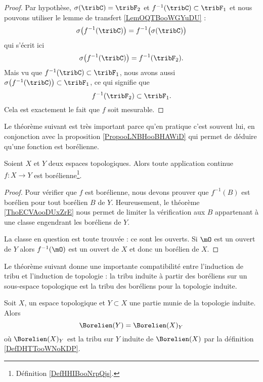 \begin{proof}
    Par hypothèse, \( \sigma(\tribC)=\tribF_2\) et \( f^{-1}(\tribC)\subset \tribF_1\) et nous pouvons utiliser le lemme de transfert \ref{LemOQTBooWGYuDU} :
    \begin{equation}
        \sigma\big( f^{-1}(\tribC) \big)=f^{-1}\big( \sigma(\tribC) \big)
    \end{equation}
    qui s'écrit ici
    \begin{equation}
        \sigma\big( f^{-1}(\tribC) \big)=f^{-1}(\tribF_2).
    \end{equation}
    Mais vu que \( f^{-1}(\tribC)\subset \tribF_1\), nous avons aussi \( \sigma\big( f^{-1}(\tribC) \big)\subset \tribF_1\), ce qui signifie que
    \begin{equation}
        f^{-1}(\tribF_2)\subset \tribF_1.
    \end{equation}
    Cela est exactement le fait que \( f\) soit mesurable.
\end{proof}

Le théorème suivant est très important parce qu'en pratique c'est souvent lui, en conjonction avec la proposition \ref{PropooLNBHooBHAWiD} qui permet de déduire qu'une fonction est borélienne.
\begin{theorem}     \label{ThoJDOKooKaaiJh}
    Soient \( X\) et \( Y\) deux espaces topologiques. Alors toute application continue \( f\colon X\to Y\) est borélienne\footnote{Définition \ref{DefHHIBooNrpQjs}.}.
\end{theorem}

\begin{proof}
    Pour vérifier que \( f\) est borélienne, nous devons prouver que \( f^{-1}(B)\) est borélien pour tout borélien \( B\) de \( Y\). Heureusement, le théorème \ref{ThoECVAooDUxZrE} nous permet de limiter la vérification aux \( B\) appartenant à une classe engendrant les boréliens de \( Y\).

    La classe en question est toute trouvée : ce sont les ouverts. Si \( \mO\) est un ouvert de \( Y\) alors \( f^{-1}(\mO)\) est un ouvert de \( X\) et donc un borélien de \( X\).
\end{proof}

Le théorème suivant donne une importante compatibilité entre l'induction de tribu et l'induction de topologie : la tribu induite à partir des boréliens sur un sous-espace topologique est la tribu des boréliens pour la topologie induite.
\begin{theorem}     \label{ThoSVTHooChgvYa}
    Soit \( X\), un espace topologique et \( Y\subset X\) une partie munie de la topologie induite. Alors
    \begin{equation}
        \Borelien(Y)=\Borelien(X)_Y
    \end{equation}
    où \( \Borelien(X)_Y\) est la tribu sur \( Y\) induite de \( \Borelien(X)\) par la définition \ref{DefDHTTooWNoKDP}.
\end{theorem}

